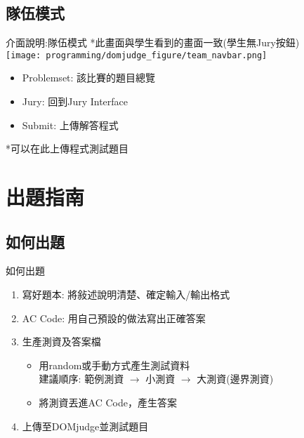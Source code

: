 \documentclass[aspectratio=169,xcolor=dvipsnames]{beamer}
\begin{document}
    \subsection{隊伍模式}
    \begin{frame}{介面說明:隊伍模式}
        *此畫面與學生看到的畫面一致(學生無Jury按鈕) \\
        \texttt{[image: programming/domjudge\_figure/team\_navbar.png]}
        \begin{itemize}
            \item Problemset: 該比賽的題目總覽
            \item Jury: 回到Jury Interface
            \item Submit: 上傳解答程式
        \end{itemize}
        
        *可以在此上傳程式測試題目
    \end{frame}
    
    \section{出題指南}

    \subsection{如何出題}
    \begin{frame}{如何出題}
        \begin{enumerate}
            \item 寫好題本: 將敍述說明清楚、確定輸入/輸出格式
            \item AC Code: 用自己預設的做法寫出正確答案
            \item 生產測資及答案檔\\
            \begin{itemize}
                \item 用random或手動方式產生測試資料 \\
                    建議順序: 範例測資 $\rightarrow$ 小測資 $\rightarrow$ 大測資(邊界測資)
                \item 將測資丟進AC Code，產生答案
            \end{itemize}
            \item 上傳至DOMjudge並測試題目
        \end{enumerate}
    \end{frame}
    
\end{document}
